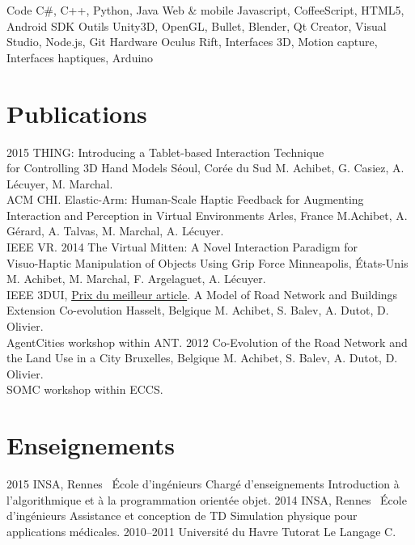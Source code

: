 \documentclass[]{friggeri-cv}
\begin{document}
\begin{entrylist}
	\entry
		{Code}
		{C\#, C++, Python, Java}
		{}
		{}
	\entry
		{Web \& mobile}
		{Javascript, CoffeeScript, HTML5, Android SDK}
		{}
		{}
	\entry
		{Outils}
		{Unity3D, OpenGL, Bullet, Blender, Qt Creator, Visual Studio, Node.js, Git}
		{}
		{}
	\entry
		{Hardware}
		{Oculus Rift, Interfaces 3D, Motion capture, Interfaces haptiques, Arduino}
		{}
		{}
\end{entrylist}

\section{Publications}

\begin{entrylist}
  \entry
    {2015}
    {THING: Introducing a Tablet-based Interaction Technique\\ for Controlling 3D Hand Models}
    {Séoul, Corée du Sud}
    {M. Achibet, G. Casiez, A. Lécuyer, M. Marchal.\\ ACM CHI.}
  \entry
    {}
    {Elastic-Arm: Human-Scale Haptic Feedback for Augmenting\\ Interaction and Perception in Virtual Environments}
    {Arles, France}
    {M.Achibet, A. Gérard, A. Talvas, M. Marchal, A. Lécuyer.\\ IEEE VR.}
  \entry
    {2014}
    {The Virtual Mitten: A Novel Interaction Paradigm for\\ Visuo-Haptic Manipulation of Objects Using Grip Force}
    {Minneapolis, \'Etats-Unis}
    {M. Achibet, M. Marchal, F. Argelaguet, A. Lécuyer.\\ IEEE 3DUI, \underline{Prix du meilleur article}.}
  \entry
    {}
    {A Model of Road Network and Buildings Extension Co-evolution}
    {Hasselt, Belgique}
    {M. Achibet, S. Balev, A. Dutot, D. Olivier.\\ AgentCities workshop within ANT.}
  \entry
    {2012}
    {Co-Evolution of the Road Network and the Land Use in a City}
    {Bruxelles, Belgique}
    {M. Achibet, S. Balev, A. Dutot, D. Olivier.\\ SOMC workshop within ECCS.}
\end{entrylist}

\newpage

\section{Enseignements}

\begin{entrylist}
  \entry
    {2015}
    {INSA, Rennes \textemdash\ \'Ecole d'ingénieurs}
    {Chargé d'enseignements}
    {Introduction à l'algorithmique et à la programmation orientée objet.}
  \entry
    {2014}
    {INSA, Rennes \textemdash\ \'Ecole d'ingénieurs}
    {Assistance et conception de TD}
    {Simulation physique pour applications médicales.}
  \entry
    {2010–2011}
    {Université du Havre}
    {Tutorat}
    {Le Langage C.}
\end{entrylist}
\end{document}
